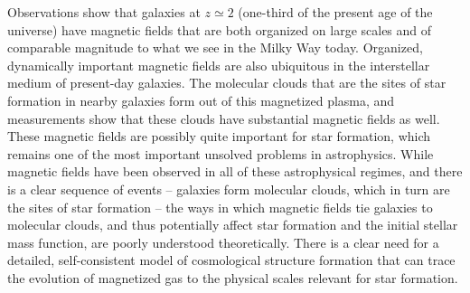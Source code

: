 Observations show that galaxies at $z
\simeq 2$ (one-third of the present age of the universe) have magnetic
fields that are both organized on large scales and of comparable
magnitude to what we see in the Milky Way today.  Organized, dynamically important magnetic fields are also
ubiquitous in the interstellar medium of present-day galaxies.  The
molecular clouds that are the sites of star formation in nearby
galaxies form out of this magnetized plasma, and measurements show
that these clouds have substantial magnetic fields as well.  These
magnetic fields are possibly quite important for star formation, which
remains one of the most important unsolved problems in astrophysics.
While magnetic fields have been observed in all of these astrophysical
regimes, and there is a clear sequence of events -- galaxies form
molecular clouds, which in turn are the sites of star formation -- the
ways in which magnetic fields tie galaxies to molecular clouds, and
thus potentially affect star formation and the initial stellar mass
function, are poorly understood theoretically.  
There is a
clear need for a detailed, self-consistent model of cosmological
structure formation that can trace the evolution of magnetized gas to
the physical scales relevant for star formation.


